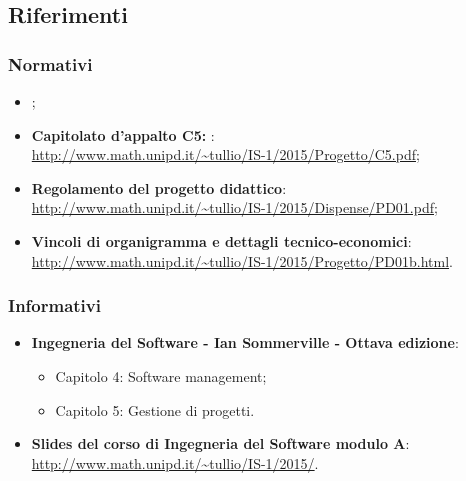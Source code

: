 \subsection{Riferimenti}
\subsubsection{Normativi}
	\begin{itemize}
		\item \textit{\NdPv};
		\item \textbf{Capitolato d'appalto C5: \progetto}:\\
		\url{http://www.math.unipd.it/~tullio/IS-1/2015/Progetto/C5.pdf};
		\item \textbf{Regolamento del progetto didattico}:\\
		\url{http://www.math.unipd.it/~tullio/IS-1/2015/Dispense/PD01.pdf};
		\item \textbf{Vincoli di organigramma e dettagli tecnico-economici}:\\
		\url{http://www.math.unipd.it/~tullio/IS-1/2015/Progetto/PD01b.html}.
	\end{itemize}
\subsubsection{Informativi}
	\begin{itemize}
		\item \textbf{Ingegneria del Software - Ian Sommerville - Ottava edizione}:
		\begin{itemize}
			\item Capitolo 4: Software management;
			\item Capitolo 5: Gestione di progetti.
		\end{itemize}
		\item \textbf{Slides del corso di Ingegneria del Software modulo A}:\\
		\url{http://www.math.unipd.it/~tullio/IS-1/2015/}.
	\end{itemize}
